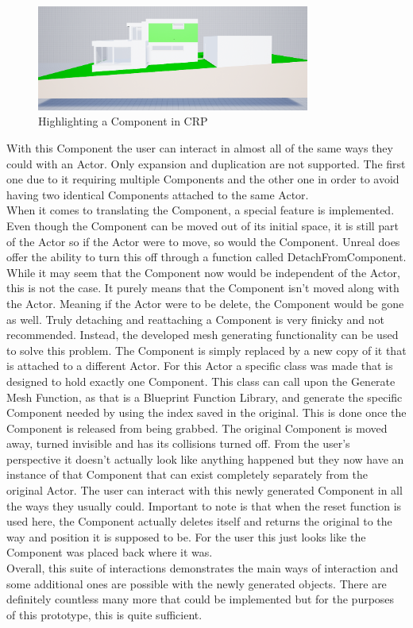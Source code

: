\begin{figure}[htpb]
	\centering
	\includegraphics[width=0.8\textwidth]{fig/ComponentHighlight.png}
	\caption[Highlighting a Component in CRP]{Highlighting a Component in CRP\protect}
	\label{fig:ComponentHighlight}
\end{figure}

With this Component the user can interact in almost all of the same ways they could with an Actor. Only expansion and duplication are not supported. The first one due to it requiring multiple Components and the other one in order to avoid having two identical Components attached to the same Actor.\\
When it comes to translating the Component, a special feature is implemented. Even though the Component can be moved out of its initial space, it is still part of the Actor so if the Actor were to move, so would the Component. Unreal does offer the ability to turn this off through a function called DetachFromComponent. While it may seem that the Component now would be independent of the Actor, this is not the case. It purely means that the Component isn't moved along with the Actor. Meaning if the Actor were to be delete, the Component would be gone as well. Truly detaching and reattaching a Component is very finicky and not recommended. Instead, the developed mesh generating functionality can be used to solve this problem. The Component is simply replaced by a new copy of it that is attached to a different Actor. For this Actor a specific class was made that is designed to hold exactly one Component. This class can call upon the Generate Mesh Function, as that is a Blueprint Function Library, and generate the specific Component needed by using the index saved in the original. This is done once the Component is released from being grabbed. The original Component is moved away, turned invisible and has its collisions turned off. From the user's perspective it doesn't actually look like anything happened but they now have an instance of that Component that can exist completely separately from the original Actor. The user can interact with this newly generated Component in all the ways they usually could. Important to note is that when the reset function is used here, the Component actually deletes itself and returns the original to the way and position it is supposed to be. For the user this just looks like the Component was placed back where it was.\\
Overall, this suite of interactions demonstrates the main ways of interaction and some additional ones are possible with the newly generated objects. There are definitely countless many more that could be implemented but for the purposes of this prototype, this is quite sufficient. 
